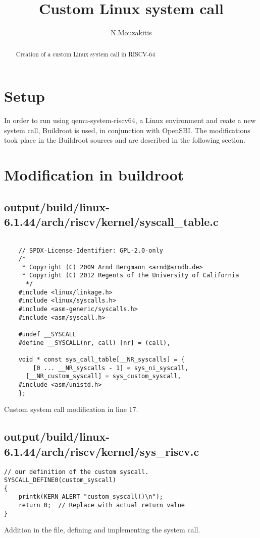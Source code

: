 \documentclass[a4paper,11pt]{article}
\title{Custom Linux system call}
\author{N.Mouzakitis}
\begin{document}
\maketitle
\tableofcontents

\begin{abstract}
Creation of a custom Linux system call in RISCV-64
\end{abstract}

\section{Setup}
In order to run using qemu-system-riscv64, a Linux environment and reate a new system call,
Buildroot is used, in conjunction with OpenSBI. The modifications took place in the Buildroot sources 
and are described in the following section.

\section {Modification in buildroot}


    \subsection{output/build/linux-6.1.44/arch/riscv/kernel/syscall\_table.c}
    \begin{lstlisting}

    // SPDX-License-Identifier: GPL-2.0-only
    /*
     * Copyright (C) 2009 Arnd Bergmann <arnd@arndb.de>
     * Copyright (C) 2012 Regents of the University of California
      */
    #include <linux/linkage.h>
    #include <linux/syscalls.h>
    #include <asm-generic/syscalls.h>
    #include <asm/syscall.h>

    #undef __SYSCALL
    #define __SYSCALL(nr, call)	[nr] = (call),

    void * const sys_call_table[__NR_syscalls] = {
	    [0 ... __NR_syscalls - 1] = sys_ni_syscall,
      [__NR_custom_syscall] = sys_custom_syscall,
    #include <asm/unistd.h>
    };
    \end{lstlisting}
Custom system call modification in line 17.
\subsection{output/build/linux-6.1.44/arch/riscv/kernel/sys\_riscv.c}
    \begin{lstlisting}
// our definition of the custom syscall.
SYSCALL_DEFINE0(custom_syscall)
{
    printk(KERN_ALERT "custom_syscall()\n");
    return 0;  // Replace with actual return value
}

    \end{lstlisting}
Addition in the file, defining and implementing the system call.
\end{document}
